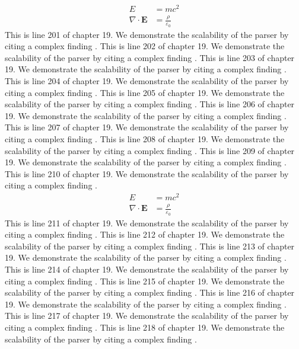 \begin{align*}
  E &= mc^2 \\
  \nabla \cdot \mathbf{E} &= \frac{\rho}{\varepsilon_0}
\end{align*}
This is line 201 of chapter 19. We demonstrate the scalability of the parser by citing a complex finding \cite{ref19_201}.
This is line 202 of chapter 19. We demonstrate the scalability of the parser by citing a complex finding \cite{ref19_202}.
This is line 203 of chapter 19. We demonstrate the scalability of the parser by citing a complex finding \cite{ref19_203}.
This is line 204 of chapter 19. We demonstrate the scalability of the parser by citing a complex finding \cite{ref19_204}.
This is line 205 of chapter 19. We demonstrate the scalability of the parser by citing a complex finding \cite{ref19_205}.
This is line 206 of chapter 19. We demonstrate the scalability of the parser by citing a complex finding \cite{ref19_206}.
This is line 207 of chapter 19. We demonstrate the scalability of the parser by citing a complex finding \cite{ref19_207}.
This is line 208 of chapter 19. We demonstrate the scalability of the parser by citing a complex finding \cite{ref19_208}.
This is line 209 of chapter 19. We demonstrate the scalability of the parser by citing a complex finding \cite{ref19_209}.
This is line 210 of chapter 19. We demonstrate the scalability of the parser by citing a complex finding \cite{ref19_210}.
\begin{align*}
  E &= mc^2 \\
  \nabla \cdot \mathbf{E} &= \frac{\rho}{\varepsilon_0}
\end{align*}
This is line 211 of chapter 19. We demonstrate the scalability of the parser by citing a complex finding \cite{ref19_211}.
This is line 212 of chapter 19. We demonstrate the scalability of the parser by citing a complex finding \cite{ref19_212}.
This is line 213 of chapter 19. We demonstrate the scalability of the parser by citing a complex finding \cite{ref19_213}.
This is line 214 of chapter 19. We demonstrate the scalability of the parser by citing a complex finding \cite{ref19_214}.
This is line 215 of chapter 19. We demonstrate the scalability of the parser by citing a complex finding \cite{ref19_215}.
This is line 216 of chapter 19. We demonstrate the scalability of the parser by citing a complex finding \cite{ref19_216}.
This is line 217 of chapter 19. We demonstrate the scalability of the parser by citing a complex finding \cite{ref19_217}.
This is line 218 of chapter 19. We demonstrate the scalability of the parser by citing a complex finding \cite{ref19_218}.
